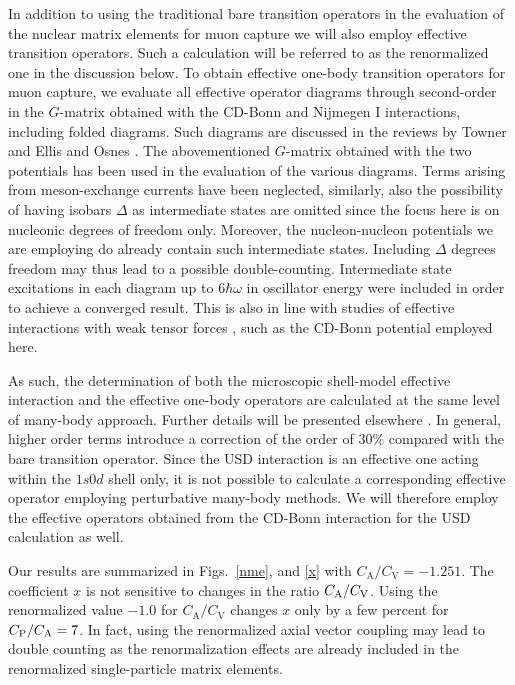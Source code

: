 \begin{multicols}{2}
In addition to using the
traditional bare transition operators in the evaluation of the nuclear
matrix elements for muon capture we will also employ
effective transition operators. Such a calculation
will be referred to as the renormalized one in the discussion
below. To obtain effective one-body
transition operators for muon capture, we evaluate all
effective operator diagrams through second-order in the
$G$-matrix obtained with  the CD-Bonn and Nijmegen I interactions,
including folded diagrams. Such diagrams
are discussed in the reviews by Towner \cite{towner87}
and Ellis and Osnes \cite{eo77}. The abovementioned $G$-matrix
obtained with the two potentials has been used in the evaluation
of the various diagrams.
Terms arising from meson-exchange currents have
been neglected, similarly, also the possibility
of having isobars $\Delta$ as intermediate states are omitted
since the focus here is  on nucleonic degrees
of freedom only. Moreover, the nucleon-nucleon potentials
we are employing do already contain such intermediate states.
Including $\Delta$ degrees freedom may thus lead to a possible
double-counting.
Intermediate state excitations in each diagram
up to $6\hbar\omega$ in oscillator energy were included
in order to achieve a converged result. This is also in line
with studies of effective interactions with weak tensor
forces \cite{sommerman},
such as the CD-Bonn potential employed here.

As such, the determination of both the microscopic
shell-model effective interaction and the effective
one-body operators are calculated at the same level of many-body
approach. Further details will be presented elsewhere \cite{ssh98}.
In general, higher order terms introduce a correction of the
order of $30\%$ compared with the bare transition operator.
Since the USD interaction is an effective one acting
within the $1s0d$ shell only, it is not possible to calculate
a corresponding effective operator employing perturbative
many-body methods. We will therefore employ the effective operators obtained
from the CD-Bonn interaction for the USD calculation as well.

Our results are summarized in Figs.\ \ref{nme}, and \ref{x} with
$C_{\mathrm A}/C_{\mathrm V}=-1.251$. The coefficient $x$ is not sensitive
to changes in the ratio $C_{\rm A}/C_{\rm V}$. Using the renormalized value
$-1.0$ for $C_{\mathrm A}/C_{\mathrm V}$ changes $x$ only by a few percent for
$C_{\rm P}/C_{\rm A}=7$. In fact, using the renormalized axial vector coupling
may lead to double counting as the renormalization effects are already included
in the renormalized single-particle matrix elements.


\end{multicols}

